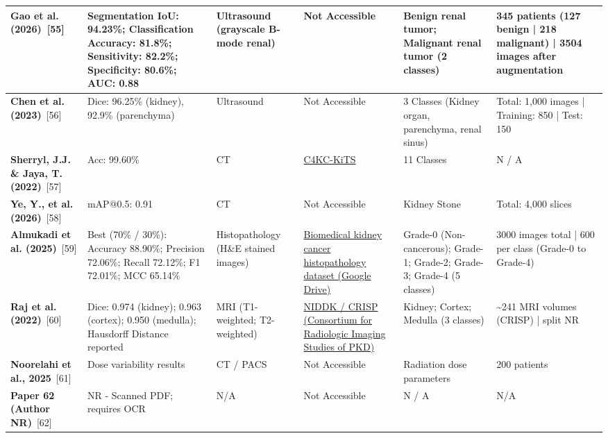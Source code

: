 \documentclass{article}
\begin{document}
\begin{longtable}{|L{2.8cm}|L{2.5cm}|L{1.5cm}|L{3.5cm}|L{3.5cm}|L{4.5cm}|}
\hline
\textbf{Gao et al. (2026)}~[55] & Segmentation IoU: 94.23\%; Classification Accuracy: 81.8\%; Sensitivity: 82.2\%; Specificity: 80.6\%; AUC: 0.88 & Ultrasound (grayscale B-mode renal) & Not Accessible & Benign renal tumor; Malignant renal tumor (2 classes) & 345 patients (127 benign | 218 malignant) | 3504 images after augmentation \\
\hline
\textbf{Chen et al. (2023)}~[56] & Dice: 96.25\% (kidney), 92.9\% (parenchyma) & Ultrasound & Not Accessible & 3 Classes (Kidney organ, parenchyma, renal sinus) & Total: 1,000 images | Training: 850 | Test: 150 \\
\hline
\textbf{Sherryl, J.J. \& Jaya, T. (2022)}~[57] & Acc: 99.60\% & CT & \href{https://www.cancerimagingarchive.net/collection/c4kc-kits/}{C4KC-KiTS} & 11 Classes & N / A \\
\hline
\textbf{Ye, Y., et al. (2026)}~[58] & mAP@0.5: 0.91 & CT & Not Accessible & Kidney Stone & Total: 4,000 slices \\
\hline
\textbf{Almukadi et al. (2025)}~[59] & Best (70\% / 30\%): Accuracy 88.90\%; Precision 72.06\%; Recall 72.12\%; F1 72.01\%; MCC 65.14\% & Histopathology (H\&E stained images) & \href{https://drive.google.com/drive/folders/1BQZGKHKOUji9rDA5IVltlLnXLk7_Elic}{Biomedical kidney cancer histopathology dataset (Google Drive)} & Grade-0 (Non-cancerous); Grade-1; Grade-2; Grade-3; Grade-4 (5 classes) & 3000 images total | 600 per class (Grade-0 to Grade-4) \\
\hline
\textbf{Raj et al. (2022)}~[60] & Dice: 0.974 (kidney); 0.963 (cortex); 0.950 (medulla); Hausdorff Distance reported & MRI (T1-weighted; T2-weighted) & \href{https://www.niddkrepository.org/studies/crisp/}{NIDDK / CRISP (Consortium for Radiologic Imaging Studies of PKD)} & Kidney; Cortex; Medulla (3 classes) & \textasciitilde{}241 MRI volumes (CRISP) | split NR \\
\hline
\textbf{Noorelahi et al., 2025}~[61] & Dose variability results & CT / PACS & Not Accessible & Radiation dose parameters & 200 patients \\
\hline
\textbf{Paper 62 (Author NR)}~[62] & NR - Scanned PDF; requires OCR & N/A & Not Accessible & N / A & N/A \\

\end{longtable}
\end{document}
